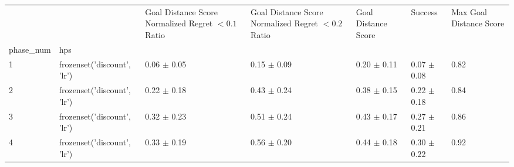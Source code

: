 \begin{tabular}{lllllll}
\toprule
 &  & Goal Distance Score Normalized Regret $< 0.1$ Ratio & Goal Distance Score Normalized Regret $< 0.2$ Ratio & Goal Distance Score & Success & Max Goal Distance Score \\
phase_num & hps &  &  &  &  &  \\
\midrule
1 & frozenset({'discount', 'lr'}) & 0.06 $\pm$ 0.05 & 0.15 $\pm$ 0.09 & 0.20 $\pm$ 0.11 & 0.07 $\pm$ 0.08 & 0.82 \\
\cline{1-7}
2 & frozenset({'discount', 'lr'}) & 0.22 $\pm$ 0.18 & 0.43 $\pm$ 0.24 & 0.38 $\pm$ 0.15 & 0.22 $\pm$ 0.18 & 0.84 \\
\cline{1-7}
3 & frozenset({'discount', 'lr'}) & 0.32 $\pm$ 0.23 & 0.51 $\pm$ 0.24 & 0.43 $\pm$ 0.17 & 0.27 $\pm$ 0.21 & 0.86 \\
\cline{1-7}
4 & frozenset({'discount', 'lr'}) & 0.33 $\pm$ 0.19 & 0.56 $\pm$ 0.20 & 0.44 $\pm$ 0.18 & 0.30 $\pm$ 0.22 & 0.92 \\
\cline{1-7}
\bottomrule
\end{tabular}
